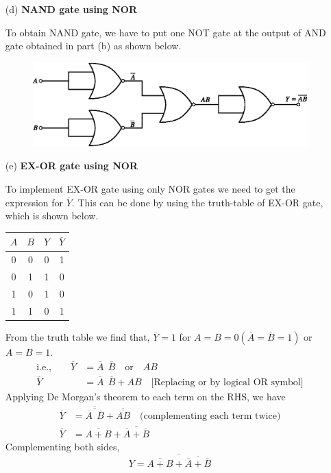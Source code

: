 \begin{solution}
\begin{itemize}
\item[(d)] {\bf NAND gate using NOR}

To obtain NAND gate, we have to put one NOT gate at the output of AND gate obtained in part (b) as shown below.
\begin{figure}[H]
\centering
\includegraphics{chap6/fig107.eps}
\end{figure}

\item[(e)] {\bf EX-OR gate using NOR}

To implement EX-OR gate using only NOR gates we need to get the
expression for $\overline{Y}$. This can be done by using the
truth-table of EX-OR gate, which is shown below. 
\begin{center}
\renewcommand{\arraystretch}{1.2}
\tabcolsep=8pt
\begin{tabular}{|c|c|c|c|}
\hline
$A$ & $B$ & $Y$ & $\overline{Y}$\\
\hline
0 & 0 & 0 & 1\\
0 & 1 & 1 & 0\\
1 & 0 & 1 & 0\\
1 & 1 & 0 & 1\\
\hline
\end{tabular}
\end{center}

From the truth table we find that, $\overline{Y}=1$ for
$A=B=0(\overline{A}=\overline{B}=1)$ or $A=B=1$.
\begin{align*}
\text{i.e.,}\qquad \overline{Y} &= \overline{A}
\ \ \overline{B}\quad\text{or}\quad AB\\[3pt]
\overline{Y} &= \overline{A} \ \ \overline{B}+AB\quad\text{[Replacing
    or by logical OR symbol]}
\end{align*}
Applying De Morgan's theorem to each term on the RHS, we have
\begin{align*}
\overline{Y} &= \overline{\overline{\overline{A}
    \ \ \overline{B}}}+\overline{\overline{A B}}\quad
\text{(complementing each term twice)}\\[3pt]
\overline{Y} &= \overline{A+B}+\overline{\overline{A}+\overline{B}}
\end{align*}
Complementing both sides,
$$
Y=\overline{\overline{A+B}+\overline{\overline{A}+\overline{B}}}
$$


\end{itemize}
\end{solution}
